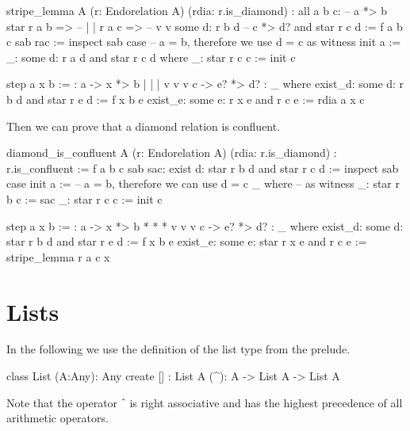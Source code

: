 \begin{alba}
  stripe_lemma
    A
    (r: Endorelation A)
    (rdia: r.is_diamond)
    : all a b c:                       --  a *> b
        star r a b =>                  --  |    |
        r a c =>                       --  v    v
        some d: r b d                  --  c *> d?
                and
                star r c d :=
     f a b c sab rac :=
       inspect sab case   -- a = b, therefore we use d = c as witness
         init a :=
           _: some d: r a d and star r c d  where
             _: star r c c := init c

         step a x b :=
           {:  a  -> x  *> b
               |     |     |
               v     v     v
               c  -> e? *> d? :}
           _ where
             exist_d: some d: r b d and star r e d := f x b e
             exist_e: some e: r x e and r c e      := rdia a x c
\end{alba}

Then we can prove that a diamond relation is confluent.

\begin{alba}
  diamond_is_confluent
    A
    (r: Endorelation A)
    (rdia: r.is_diamond)
    : r.is_confluent
    :=
      f a b c sab sac: exist d: star r b d and star r c d :=
        inspect sab case
          init a :=            -- a = b, therefore we can use d = c
            _ where            --        as witness
              _: star r b c := sac
              _: star r c c := init c

          step a x b :=
            {:  a  ->  x  *>  b
                *      *      *
                v      v      v
                c  ->  e? *>  d? :}
            _ where
              exist_d: some d: star r b d and star r e d := f x b e
              exist_e: some e: star r x e and r c e := stripe_lemma r a c x

\end{alba}




\newpage
\section{Lists}
\label{sec:certprog-lists}


In the following we use the definition of the list type from the prelude.

\begin{alba}
  class
    List (A:Any): Any
  create
    [] : List A
    (^): A -> List A -> List A
\end{alba}
%
Note that the operator $\mathrel{\hat{\ }}$ is right associative and has the
highest precedence of all arithmetic operators.



